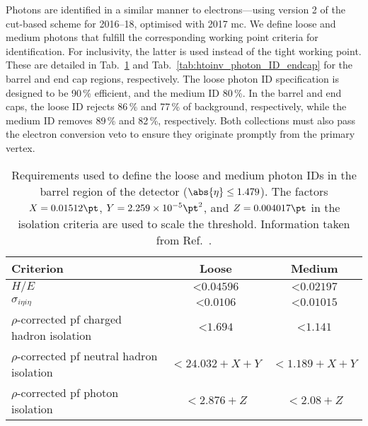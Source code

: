 Photons are identified in a similar manner to electrons---using version 2 of the cut-based scheme for 2016--18, optimised with 2017 \acrlong{mc}. We define loose \loosePhoton and medium photons \mediumPhoton that fulfill the corresponding working point criteria for identification. For inclusivity, the latter is used instead of the tight working point. These are detailed in Tab.~\ref{tab:htoinv_photon_ID_barrel} and Tab.~\ref{tab:htoinv_photon_ID_endcap} for the barrel and end cap regions, respectively. The loose photon ID specification is designed to be 90\,\% efficient, and the medium ID 80\,\%. In the barrel and end caps, the loose ID rejects 86\,\% and 77\,\% of background, respectively, while the medium ID removes 89\,\% and 82\,\%, respectively. Both collections must also pass the electron conversion veto to ensure they originate promptly from the primary vertex.

\begin{table}[htbp]
    \centering
    \begin{tabular}{lcc}
        \hline
        Criterion & Loose & Medium \\\hline
        $H/E$ & $< \text{0.04596}$ & $< \text{0.02197}$ \\
        $\sigma_{i\eta i\eta}$ & $< \text{0.0106}$ & $< \text{0.01015}$ \\
        $\rho$-corrected \acrshort{pf} charged hadron isolation & $< \text{1.694}$ & $< \text{1.141}$ \\
        $\rho$-corrected \acrshort{pf} neutral hadron isolation & $< \text{24.032} + X + Y$ & $< \text{1.189} + X + Y$ \\
        $\rho$-corrected \acrshort{pf} photon isolation & $< \text{2.876} + Z$ & $< \text{2.08} + Z$ \\\hline
    \end{tabular}
    \caption[Requirements used to define the loose and medium photon IDs in the barrel region of the detector ($\abs{\eta} \leq \text{1.479}$)]{Requirements used to define the loose and medium photon IDs in the barrel region of the detector ($\abs{\eta} \leq \text{1.479}$). The factors $X = \text{0.01512}\pt$, $Y = \text{2.259} \times \text{10}^{-5}\pt^2$, and $Z = \text{0.004017}\pt$ in the isolation criteria are used to scale the threshold. Information taken from Ref.~.}
    \label{tab:htoinv_photon_ID_barrel}
\end{table}

